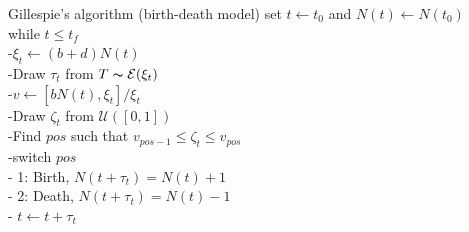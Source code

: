 \documentclass[aspectratio=169]{beamer}
\begin{document}
\begin{frame}{Gillespie's algorithm (birth-death model)}
set $t\leftarrow t_0$ and $N(t)\leftarrow N(t_0)$\\
while {$t\leq t_f$}\\
-\qquad $\xi_t\leftarrow (b+d)N(t)$\\
-\qquad Draw $\tau_t$ from $T\thicksim \mathcal{E}(\xi_t)$\\
-\qquad $v\leftarrow\left[bN(t),\xi_t\right]/\xi_t$\\
-\qquad Draw $\zeta_t$ from $\mathcal{U}([0,1])$\\
-\qquad Find $pos$ such that $v_{pos-1}\leq\zeta_t\leq v_{pos}$\\
-\qquad switch {$pos$}\\
\qquad\qquad - 1: Birth, $N(t+\tau_t)=N(t)+1$ \\
\qquad\qquad - 2: Death, $N(t+\tau_t)=N(t)-1$ \\
- $t\leftarrow t+\tau_t$    
\end{frame}
\end{document}
